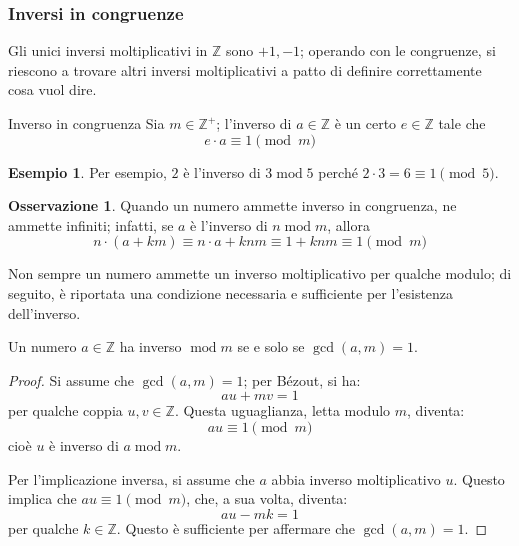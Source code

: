 \documentclass[11pt, a4paper]{scrartcl}
\theoremstyle{definition}
\newtheorem{esempio}{Esempio}
\numberwithin{esempio}{section}
\theoremstyle{definition}
\newtheorem{obs}{Osservazione}
\numberwithin{obs}{section}
\numberwithin{nota}{section}
\numberwithin{equation}{subsection}
\begin{document}
\subsubsection{Inversi in congruenze}
Gli unici inversi moltiplicativi in $\mathbb{Z}$ sono $+1, -1$; operando con le congruenze, si riescono a trovare altri inversi moltiplicativi a patto di definire correttamente cosa vuol dire.
\begin{definizione}
	{Inverso in congruenza}{}
	Sia $m \in  \mathbb{Z}^+$; l'inverso di $a \in \mathbb{Z}$ \`e un certo $e \in \mathbb{Z}$ tale che
	\[
	e \cdot  a \equiv 1 \pmod{m} 
	\] 
\end{definizione}
\begin{esempio}
Per esempio, $2$ \`e l'inverso di $3 \operatorname{mod} 5$ perch\'e $2 \cdot 3 = 6 \equiv 1 \pmod{5} $.
\end{esempio}
\begin{obs}
	Quando un numero ammette inverso in congruenza, ne ammette infiniti; infatti, se $a$ \`e l'inverso di $n \operatorname{mod} m$, allora
	\[
	n \cdot  ( a+km ) \equiv n\cdot a + knm \equiv 1 + knm \equiv 1 \pmod{m} 
	\] 
\end{obs}
Non sempre un numero ammette un inverso moltiplicativo per qualche modulo; di seguito, \`e riportata una condizione necessaria e sufficiente per l'esistenza dell'inverso.
\begin{teorema}
	{}{}
	Un numero $a \in \mathbb{Z}$ ha inverso $\operatorname{mod} m $ se e solo se $\operatorname{gcd}(a,m) = 1$.
	\begin{proof}
		Si assume che $\operatorname{gcd}(a,m) =1 $; per B\'ezout, si ha:
		\[
		a u + m v = 1 
		\] 
		per qualche coppia $u,v \in \mathbb{Z}$. 
		Questa uguaglianza, letta modulo $m$, diventa:
		\[
		a u \equiv 1 \pmod{m} 
		\] 
		cio\`e $u$ \`e inverso di $a \operatorname{mod}m  $.

		Per l'implicazione inversa, si assume che $a$ abbia inverso moltiplicativo $u$.
		Questo implica che $au \equiv 1 \pmod{m} $, che, a sua volta, diventa:
		\[
		a u - mk =1
		\] 
		per qualche $k \in \mathbb{Z}$. 
		Questo \`e sufficiente per affermare che $\operatorname{gcd}(a,m) =1$. 
	\end{proof}
\end{teorema}
\end{document}
